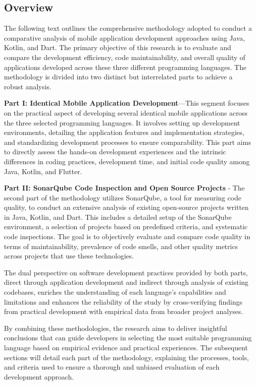 \subsection{Overview}
The following text outlines the comprehensive methodology adopted to conduct a comparative analysis of mobile application development approaches using Java, Kotlin, and Dart. The primary objective of this research is to evaluate and compare the development efficiency, code maintainability, and overall quality of applications developed across these three different programming languages. The methodology is divided into two distinct but interrelated parts to achieve a robust analysis.
\par
\textbf{Part I: Identical Mobile Application Development}—This segment focuses on the practical aspect of developing several identical mobile applications across the three selected programming languages. It involves setting up development environments, detailing the application features and implementation strategies, and standardizing development processes to ensure comparability. This part aims to directly assess the hands-on development experiences and the intrinsic differences in coding practices, development time, and initial code quality among Java, Kotlin, and Flutter.
\par
\textbf{Part II: SonarQube Code Inspection and Open Source Projects} - The second part of the methodology utilizes SonarQube, a tool for measuring code quality, to conduct an extensive analysis of existing open-source projects written in Java, Kotlin, and Dart. This includes a detailed setup of the SonarQube environment, a selection of projects based on predefined criteria, and systematic code inspections. The goal is to objectively evaluate and compare code quality in terms of maintainability, prevalence of code smells, and other quality metrics across projects that use these technologies.
\par
The dual perspective on software development practices provided by both parts, direct through application development and indirect through analysis of existing codebases, enriches the understanding of each language's capabilities and limitations and enhances the reliability of the study by cross-verifying findings from practical development with empirical data from broader project analyses.
\par
By combining these methodologies, the research aims to deliver insightful conclusions that can guide developers in selecting the most suitable programming language based on empirical evidence and practical experiences. The subsequent sections will detail each part of the methodology, explaining the processes, tools, and criteria used to ensure a thorough and unbiased evaluation of each development approach.

